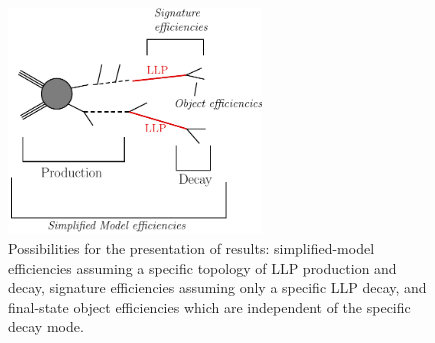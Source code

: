 \begin{figure}[t]
\begin{center}
\includegraphics[width=0.6\textwidth,angle=0]{ch5-figures/LLPdiagramScheme.pdf}
\end{center}
\caption{Possibilities for the presentation of results: 
simplified-model efficiencies assuming a specific topology of LLP production and decay, 
signature efficiencies assuming only a specific LLP decay, and final-state object efficiencies which are 
independent of the specific decay mode.
}
\label{fig:ch5_presentation_options}
\end{figure}



